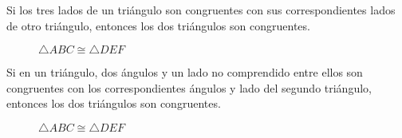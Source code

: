 \begin{postulate}
    Si los tres lados de un triángulo son congruentes con sus correspondientes lados de otro triángulo, entonces los dos triángulos son congruentes.

    \begin{figure}[h!]

        \centering

        \begin{subfigure}[b]{.5\textwidth}
            \centering
            
            \label{fig:traing-cong-lll-1}
        \end{subfigure}%
        \begin{subfigure}[b]{.5\textwidth}
            \centering
            
            \label{fig:triang-cong-lll-2}
        \end{subfigure}

        \centering
        \caption{$\triangle{ABC} \cong \triangle{DEF}$}
        \label{fig:triang-cong-lll}
        
    \end{figure}    
    
\end{postulate}

\begin{postulate}
    Si en un triángulo, dos ángulos y un lado no comprendido entre ellos son congruentes con los correspondientes ángulos y lado del segundo triángulo, entonces los dos triángulos son congruentes.

    \begin{figure}[h!]

        \centering

        \begin{subfigure}[b]{.5\textwidth}
            \centering
            
            \label{fig:triang-cong-aal-1}
        \end{subfigure}%
        \begin{subfigure}[b]{.5\textwidth}
            \centering
            
            \label{fig:triang-cong-aal-2}
        \end{subfigure}

        \centering
        \caption{$\triangle{ABC} \cong \triangle{DEF}$}
        \label{fig:triang-cong-aal}
        
    \end{figure}    
    
\end{postulate}

